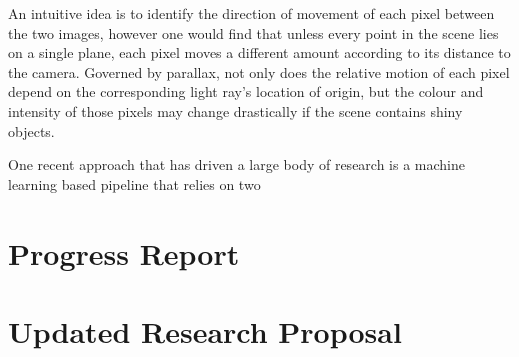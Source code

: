 \documentclass[openany]{book}
\begin{document}
An intuitive idea is to identify the direction of movement of each pixel between the two images, however one would find that unless every point in the scene lies on a single plane, each pixel moves a different amount according to its distance to the camera. Governed by parallax, not only does the relative motion of each pixel depend on the corresponding light ray's location of origin, but the colour and intensity of those pixels may change drastically if the scene contains shiny objects.

One recent approach that has driven a large body of research is a machine learning based pipeline that relies on two 

\chapter{Progress Report}

\chapter{Updated Research Proposal}


\newpage



\end{document}
